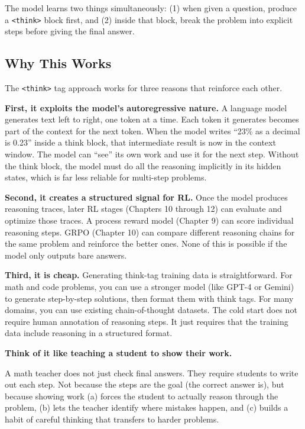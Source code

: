 \begin{chapterenv}
The model learns two things simultaneously: (1) when given a question, produce a \texttt{<think>} block first, and (2) inside that block, break the problem into explicit steps before giving the final answer.

\subsection{Why This Works}

The \texttt{<think>} tag approach works for three reasons that reinforce each other.

\textbf{First, it exploits the model's autoregressive nature.} A language model generates text left to right, one token at a time. Each token it generates becomes part of the context for the next token. When the model writes ``23\% as a decimal is 0.23'' inside a think block, that intermediate result is now in the context window. The model can ``see'' its own work and use it for the next step. Without the think block, the model must do all the reasoning implicitly in its hidden states, which is far less reliable for multi-step problems.

\textbf{Second, it creates a structured signal for RL.} Once the model produces reasoning traces, later RL stages (Chapters 10 through 12) can evaluate and optimize those traces. A process reward model (Chapter 9) can score individual reasoning steps. GRPO (Chapter 10) can compare different reasoning chains for the same problem and reinforce the better ones. None of this is possible if the model only outputs bare answers.

\textbf{Third, it is cheap.} Generating think-tag training data is straightforward. For math and code problems, you can use a stronger model (like GPT-4 or Gemini) to generate step-by-step solutions, then format them with think tags. For many domains, you can use existing chain-of-thought datasets. The cold start does not require human annotation of reasoning steps. It just requires that the training data include reasoning in a structured format.

\begin{infobox}
\textbf{Think of it like teaching a student to show their work.}

A math teacher does not just check final answers. They require students to write out each step. Not because the steps are the goal (the correct answer is), but because showing work (a) forces the student to actually reason through the problem, (b) lets the teacher identify where mistakes happen, and (c) builds a habit of careful thinking that transfers to harder problems.


\end{infobox}
\end{chapterenv}
